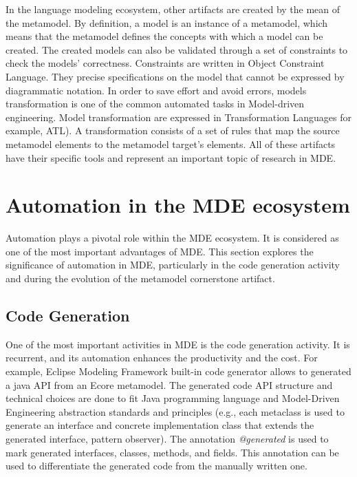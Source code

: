In the language modeling ecosystem, other artifacts are created by the mean of the metamodel. By definition, a model is an instance of a metamodel, which means that the metamodel defines the concepts with which a model can be created. The created models can also be validated through a set of constraints to check the models' correctness. Constraints are written in Object Constraint Language. They precise specifications on the model that cannot be  expressed by diagrammatic notation. In order to save effort and avoid errors, models transformation is one of the common automated tasks in Model-driven engineering. Model transformation are expressed in  Transformation Languages for example, ATL). A transformation consists of a set of rules that map the source metamodel elements to the metamodel target’s elements. All of these artifacts have their specific tools and represent an important topic of research in MDE.


\section{Automation in the MDE ecosystem}
\label{mde_automation}
 Automation plays a pivotal role within the MDE ecosystem. It is considered as one of the most important advantages of MDE. This section explores the significance of automation in MDE, particularly in the code generation activity and during the evolution of the metamodel cornerstone artifact.
 

\subsection{Code Generation}

One of the most important activities in MDE is the code generation activity. It is recurrent, and its automation enhances the productivity and the cost. For example, Eclipse Modeling Framework built-in code generator allows to generated a java API from an Ecore metamodel. The generated code API structure and technical choices are done to fit Java programming language and Model-Driven Engineering abstraction standards and principles (e.g., each metaclass is used to generate an interface and concrete implementation class that extends the generated interface, pattern observer).
 The annotation \textit{@generated} is used to mark generated interfaces, classes, methods, and fields. This annotation can be used to differentiate the generated code from the manually written one.

